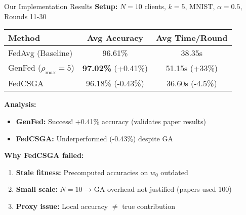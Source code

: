 \documentclass{beamer}
\begin{document}
\begin{frame}{Our Implementation Results}
\textbf{Setup:} $N=10$ clients, $k=5$, MNIST, $\alpha=0.5$, Rounds 11-30

\begin{table}
\centering
\small
\begin{tabular}{|l|c|c|}
\hline
\textbf{Method} & \textbf{Avg Accuracy} & \textbf{Avg Time/Round} \\
\hline
FedAvg (Baseline) & 96.61\% & 38.35s \\
GenFed ($\rho_{\max}=5$) & \textbf{97.02\%} (+0.41\%) & 51.15s (+33\%) \\
FedCSGA & 96.18\% (-0.43\%) & 36.60s (-4.5\%) \\
\hline
\end{tabular}
\end{table}

\textbf{Analysis:}
\begin{itemize}
\item \textbf{GenFed:} Success! +0.41\% accuracy (validates paper results)
\item \textbf{FedCSGA:} Underperformed (-0.43\%) despite GA
\end{itemize}

\textbf{Why FedCSGA failed:}
\begin{enumerate}
\item \textbf{Stale fitness:} Precomputed accuracies on $w_0$ outdated
\item \textbf{Small scale:} $N=10$ → GA overhead not justified (papers used 100)
\item \textbf{Proxy issue:} Local accuracy $\neq$ true contribution
\end{enumerate}
\end{frame}
\end{document}
